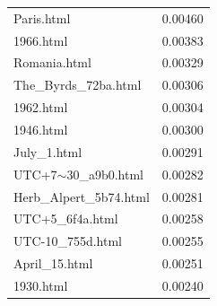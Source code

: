 \documentclass[11pt]{article}
\begin{document}
\begin{table}[H]
\begin{minipage}{0.5\textwidth}
\begin{tabular}{lc}
Paris.html & 0.00460 \\
1966.html & 0.00383 \\
Romania.html & 0.00329 \\
The\_Byrds\_72ba.html & 0.00306 \\
1962.html & 0.00304 \\
1946.html & 0.00300 \\
July\_1.html & 0.00291 \\
UTC+7$\sim$30\_a9b0.html & 0.00282 \\
Herb\_Alpert\_5b74.html & 0.00281 \\
UTC+5\_6f4a.html & 0.00258 \\
UTC-10\_755d.html & 0.00255 \\
April\_15.html & 0.00251 \\
1930.html & 0.00240
\end{tabular}
\end{minipage}
\end{table}
\end{document}
